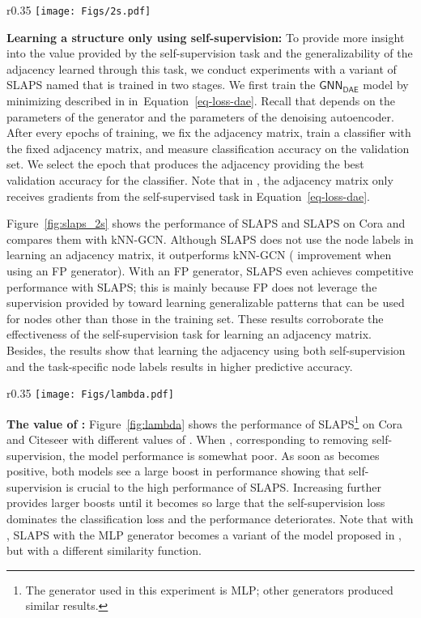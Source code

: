 \documentclass{article}
\def\Eqref#1{Equation~\ref{#1}}
\newcommand{\func}[1]{\ensuremath{\mathsf{#1}}}
\begin{document}
\begin{wrapfigure}{r}{0.35\columnwidth}
    \centering
    \texttt{[image: Figs/2s.pdf]}
    \caption{SLAPS vs SLAPS on Cora with different generators.}
    \label{fig:slaps_2s}
\end{wrapfigure}

\textbf{Learning a structure only using self-supervision:}
To provide more insight into the value provided by the self-supervision task and the generalizability of the adjacency learned through this task, we conduct experiments with a variant of SLAPS named  that is trained in two stages. We first train the \func{GNN_{DAE}} model by minimizing  described in in~\Eqref{eq-loss-dae}. Recall that  depends on the parameters  of the generator and the parameters  of the denoising autoencoder. After every  epochs of training, we fix the adjacency matrix, train a classifier with the fixed adjacency matrix, and measure classification accuracy on the validation set. We select the epoch that produces the adjacency providing the best validation accuracy for the classifier. Note that in , the adjacency matrix only receives gradients from the self-supervised task in \Eqref{eq-loss-dae}.

Figure~\ref{fig:slaps_2s} shows the performance of SLAPS and SLAPS on Cora and compares them with kNN-GCN. Although SLAPS does not use the node labels in learning an adjacency matrix, it outperforms kNN-GCN ( improvement when using an FP generator). With an FP generator, SLAPS even achieves competitive performance with SLAPS; this is mainly because FP does not leverage the supervision provided by  toward learning generalizable patterns that can be used for nodes other than those in the training set. These results corroborate the effectiveness of the self-supervision task for learning an adjacency matrix. Besides, the results show that learning the adjacency using both self-supervision and the task-specific node labels results in higher predictive accuracy.

\begin{wrapfigure}{r}{0.35\columnwidth}
    \centering
    \texttt{[image: Figs/lambda.pdf]}
    \caption{The performance of SLAPS with MLP graph generator as a function of .}
    \label{fig:lambda}
\end{wrapfigure}

\textbf{The value of :} Figure~\ref{fig:lambda} shows the performance of SLAPS\footnote{The generator used in this experiment is MLP; other generators produced similar results.} on Cora and Citeseer with different values of . When , corresponding to removing self-supervision, the model performance is somewhat poor. As soon as  becomes positive, both models see a large boost in performance showing that self-supervision is crucial to the high performance of SLAPS. Increasing  further provides larger boosts until it becomes so large that the self-supervision loss dominates the classification loss and the performance deteriorates. Note that with , SLAPS with the MLP generator becomes a variant of the model proposed in \cite{cosmo2020latent}, but with a different similarity function.
\end{document}
